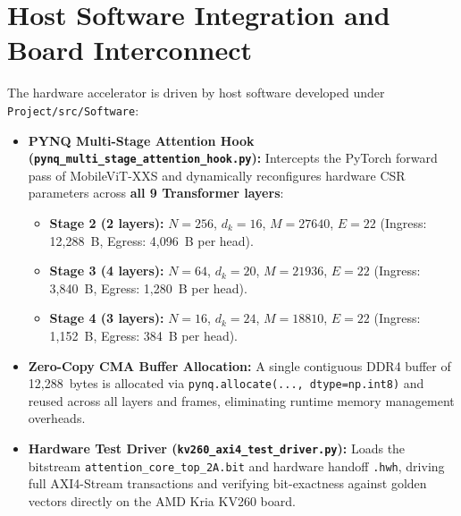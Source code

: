 \section{Host Software Integration and Board Interconnect}
The hardware accelerator is driven by host software developed under \texttt{Project/src/Software}:
\begin{itemize}
    \item \textbf{PYNQ Multi-Stage Attention Hook (\texttt{pynq\_multi\_stage\_attention\_hook.py}):} Intercepts the PyTorch forward pass of MobileViT-XXS and dynamically reconfigures hardware CSR parameters across \textbf{all 9 Transformer layers}:
    \begin{itemize}
        \item \textbf{Stage 2 (2 layers):} $N=256$, $d_k=16$, $M=27640$, $E=22$ (Ingress: 12,288~B, Egress: 4,096~B per head).
        \item \textbf{Stage 3 (4 layers):} $N=64$, $d_k=20$, $M=21936$, $E=22$ (Ingress: 3,840~B, Egress: 1,280~B per head).
        \item \textbf{Stage 4 (3 layers):} $N=16$, $d_k=24$, $M=18810$, $E=22$ (Ingress: 1,152~B, Egress: 384~B per head).
    \end{itemize}
    \item \textbf{Zero-Copy CMA Buffer Allocation:} A single contiguous DDR4 buffer of 12,288~bytes is allocated via \texttt{pynq.allocate(..., dtype=np.int8)} and reused across all layers and frames, eliminating runtime memory management overheads.
    \item \textbf{Hardware Test Driver (\texttt{kv260\_axi4\_test\_driver.py}):} Loads the bitstream \texttt{attention\_core\_top\_2A.bit} and hardware handoff \texttt{.hwh}, driving full AXI4-Stream transactions and verifying bit-exactness against golden vectors directly on the AMD Kria KV260 board.
\end{itemize}

